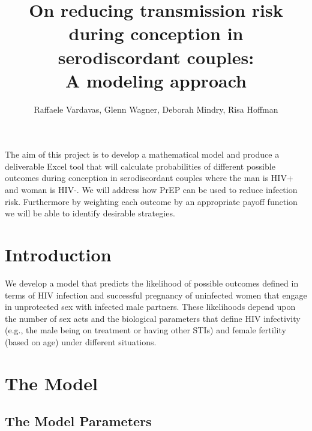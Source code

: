\documentclass[11pt]{nih_mod}
\title{{\bf On reducing transmission risk during conception in serodiscordant couples:} \\ A modeling approach }
\author{Raffaele Vardavas, Glenn Wagner, Deborah Mindry, Risa Hoffman}
\date{}
\begin{document}
\maketitle 

The aim of this project is to develop a mathematical model and produce a deliverable Excel tool that will calculate probabilities of different possible outcomes during conception in serodiscordant couples where the man is HIV+ and woman is HIV-. We will address how PrEP can be used to reduce infection risk. Furthermore by weighting each outcome by an appropriate payoff function we will be able to identify desirable strategies. 


\tableofcontents
\pagebreak

\bigskip
\section{Introduction}

We develop a model that predicts the likelihood of possible outcomes defined in terms of HIV infection and successful pregnancy of uninfected women that engage in unprotected sex with infected male partners. These likelihoods depend upon the number of sex acts and the biological parameters that define HIV infectivity (e.g., the male being on treatment or having other STIs) and female fertility (based on age) under different situations.


\section{The Model}

\subsection{The Model Parameters}
\end{document}
